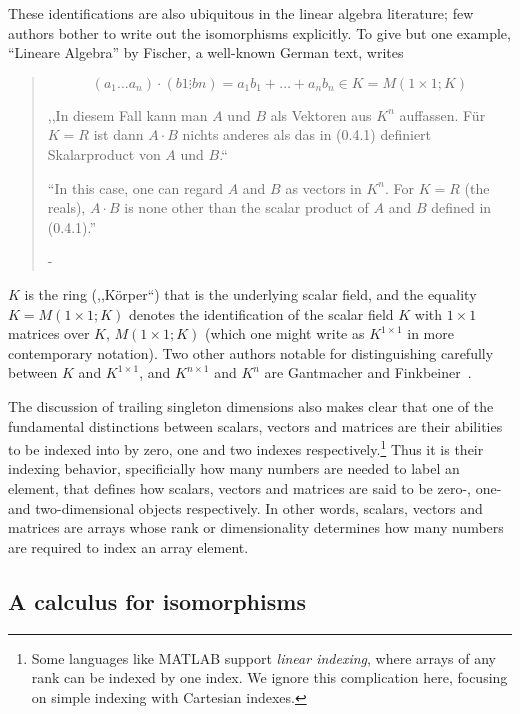 These identifications are also ubiquitous in the linear algebra literature; few authors bother to write out the isomorphisms explicitly. To give but one example, ``Lineare Algebra'' by Fischer, a well-known German text, writes

\begin{quote}
\[
(a_1...a_n) \cdot (b1 \vdots bn) = a_1 b_1 + \dots + a_n b_n \in K = M(1\times 1; K)
\]

,,In diesem Fall kann man $A$ und $B$ als Vektoren aus $K^n$ auffassen. Für $K=R$ ist dann $A\cdot B$ nichts anderes als das in (0.4.1) definiert Skalarproduct von $A$ und $B$.``

``In this case, one can regard $A$ and $B$ as vectors in $K^n$. For $K=R$ (the reals), $A\cdot B$ is none other than the scalar product of $A$ and
$B$ defined in (0.4.1).''

-\cite[p.\ 87]{Fischer1973}
\end{quote}

$K$ is the ring (,,Körper``) that is the underlying scalar field, and the equality $K = M(1\times 1; K)$ denotes the identification of the scalar field $K$ with $1\times 1$ matrices over $K$, $M(1\times 1; K)$ (which one might write as $K^{1\times1}$ in more contemporary notation). Two other authors notable for distinguishing carefully between $K$ and $K^{1\times1}$, and $K^{n\times1}$ and $K^n$ are Gantmacher\cite{Gantmacher1960} and Finkbeiner~\cite{Finkbeiner1960}.

The discussion of trailing singleton dimensions also makes clear that one of the fundamental distinctions between scalars, vectors and matrices are their abilities to be indexed into by zero, one and two indexes respectively.\footnote{Some languages like MATLAB support \textit{linear indexing}, where arrays of any rank can be indexed by one index. We ignore this complication here, focusing on simple indexing with Cartesian indexes.}
Thus it is their indexing behavior, specificially how many numbers are needed to label an element, that defines how scalars, vectors and matrices are said to be zero-, one- and two-dimensional objects respectively. In other words, scalars, vectors and matrices are arrays whose rank or dimensionality determines how many numbers are required to index an array element.


\subsection{A calculus for isomorphisms}

